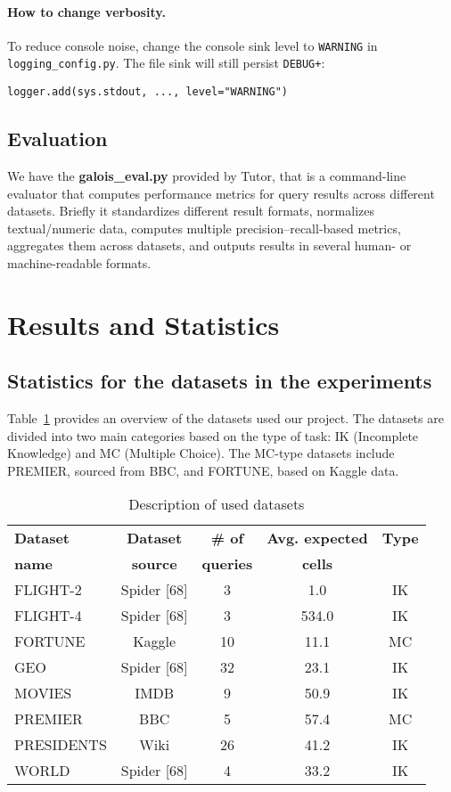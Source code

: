 \documentclass[12pt,a4paper]{article}
\begin{document}
\paragraph{How to change verbosity.}
To reduce console noise, change the console sink level to \texttt{WARNING} in
\texttt{logging\_config.py}. The file sink will still persist \texttt{DEBUG+}:
\begin{verbatim}
logger.add(sys.stdout, ..., level="WARNING")
\end{verbatim}

\subsection{Evaluation}
We have the \textbf{galois\_eval.py} provided by Tutor, that is a command-line evaluator that computes performance metrics for query results across different datasets.
Briefly it standardizes different result formats, normalizes textual/numeric data, computes multiple precision–recall-based metrics, aggregates them across datasets, and outputs results in several human- or machine-readable formats.

\section{Results and Statistics}
\subsection{Statistics for the datasets in the experiments}
Table~\ref{tab:datasets} provides an overview of the datasets used our project. The datasets are divided into two main categories based on the type of task: IK (Incomplete Knowledge) and MC (Multiple Choice).
The MC-type datasets include PREMIER, sourced from BBC, and FORTUNE, based on Kaggle data.

\begin{table}[h]
\centering
\begin{tabular}{lcccc}
\toprule
\textbf{Dataset} & \textbf{Dataset} & \textbf{\# of} & \textbf{Avg. expected} & \textbf{Type} \\
\textbf{name} & \textbf{source} & \textbf{queries} & \textbf{cells} & \\
\midrule
FLIGHT-2 & Spider [68] & 3 & 1.0 & IK \\
FLIGHT-4 & Spider [68] & 3 & 534.0 & IK \\
FORTUNE & Kaggle & 10 & 11.1 & MC \\
GEO & Spider [68] & 32 & 23.1 & IK \\
MOVIES & IMDB & 9 & 50.9 & IK \\
PREMIER & BBC & 5 & 57.4 & MC \\
PRESIDENTS & Wiki & 26 & 41.2 & IK \\
WORLD & Spider [68] & 4 & 33.2 & IK \\


\bottomrule
\end{tabular}
\caption{Description of used datasets}
\label{tab:datasets}
\end{table}
\end{document}

